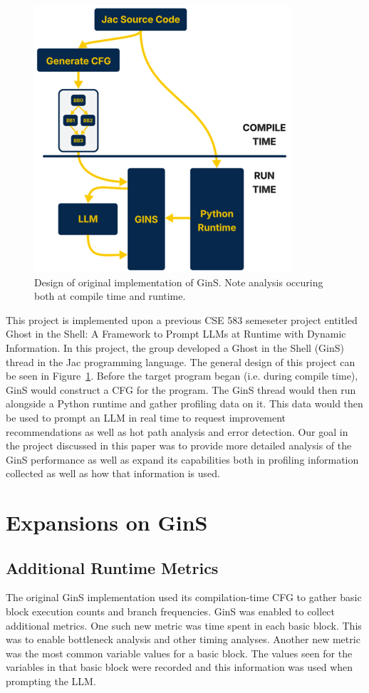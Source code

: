 \documentclass[sigconf]{acmart}
\begin{document}
\begin{figure}
    \centering
    \includegraphics[width=0.5\linewidth]{images/Picture1.png}
    \caption{Design of original implementation of GinS. Note analysis occuring both at compile time and runtime.}
    \label{fig:layout}
\end{figure}

This project is implemented upon a previous CSE 583 semeseter project entitled Ghost in the Shell: A Framework to Prompt LLMs at Runtime with Dynamic Information.
In this project, the group developed a Ghost in the Shell (GinS) thread in the Jac programming language.
The general design of this project can be seen in Figure~\ref{fig:layout}.
Before the target program began (i.e. during compile time), GinS would construct a CFG for the program.
The GinS thread would then run alongside a Python runtime and gather profiling data on it.
This data would then be used to prompt an LLM in real time to request improvement recommendations as well as hot path analysis and error detection.
Our goal in the project discussed in this paper was to provide more detailed analysis of the GinS performance as well as expand its capabilities both in profiling information collected as well as how that information is used.

\section{Expansions on GinS}

\subsection{Additional Runtime Metrics}
The original GinS implementation used its compilation-time CFG to gather basic block execution counts and branch frequencies.
GinS was enabled to collect additional metrics.
One such new metric was time spent in each basic block.
This was to enable bottleneck analysis and other timing analyses.
Another new metric was the most common variable values for a basic block.
The values seen for the variables in that basic block were recorded and this information was used when prompting the LLM.
\end{document}
